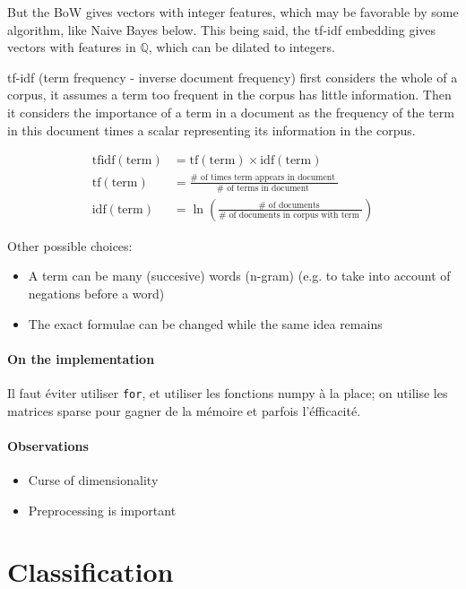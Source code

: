 \documentclass{article}
\begin{document}
But the BoW gives vectors with integer features, which may be favorable by some algorithm,
like Naive Bayes below. This being said, the tf-idf embedding gives vectors with features in $\mathbb{Q}$,
which can be dilated to integers.

tf-idf (term frequency - inverse document frequency) first considers
the whole of a corpus, it assumes a term too frequent in the corpus has little
information. Then it considers the importance of a term in a document
as the frequency of the term in this document times a scalar
representing its information in the corpus.

$$
\begin{aligned}
\mathrm{tfidf}(\mathrm{term}) & = \mathrm{tf}(\mathrm{term}) \times \mathrm{idf}(\mathrm{term}) \\
\mathrm{tf}(\mathrm{term}) & = \frac{\# \text { of times term appears in document }}{\# \text { of terms in document }} \\
\mathrm{idf}(\mathrm{term}) & =\ln \left(\frac{\# \text { of documents }}{\# \text { of documents in corpus with term }}\right)
\end{aligned}
$$

Other possible choices:

\begin{itemize}
  \item A term can be many (succesive) words (n-gram) (e.g. to
  take into account of negations before a word)
  \item The exact formulae can be changed while the same idea remains
\end{itemize}

\paragraph{On the implementation} Il faut éviter utiliser \verb|for|, et
utiliser les fonctions numpy à la place; on utilise les matrices sparse pour
gagner de la mémoire et parfois l'éfficacité.

\paragraph{Observations}
\begin{itemize}
  \item Curse of dimensionality
  \item Preprocessing is important
\end{itemize}

\section{Classification}
\end{document}
